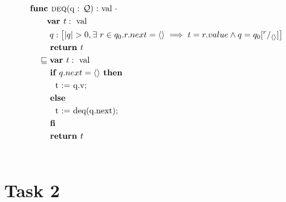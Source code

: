 \documentclass[a4paper]{scrartcl}
\newcommand{\refinedby}{\sqsubseteq} %
\begin{document}
\begin{align*}
& \textbf{func }\text{\textsc{deq}(q : $\mathcal{Q}$) :} \text{ val } \cdot \\
    & \quad \quad \textbf{var }t : \text{ val} \\
	& \quad \quad ~q : \left[ |q| > 0, \exists~r \in q_0. r.next = \langle \rangle \implies t = r.value \land q = q_0[^r/_{\langle \rangle}] \right] \\
    & \quad \quad \textbf{ return } t \\
    & \quad \refinedby \textbf{var }t : \text{ val} \\
    & \quad \quad \textbf{ if } q.next = \langle \rangle \textbf{ then} \\
	& \quad \quad \quad \text{t := q.v;} \\
    & \quad \quad \textbf{ else} \\
	& \quad \quad \quad \text{t := deq(q.next);} \\
    & \quad \quad \textbf{ fi} \\
    & \quad \quad \textbf{ return } t \\\\
\end{align*}

\section*{Task 2}
\end{document}
